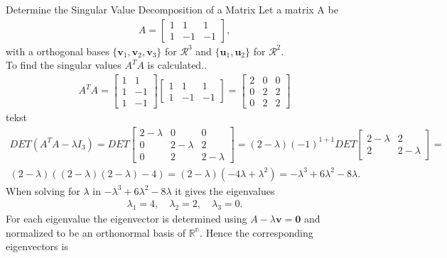 \begin{example}{Determine the Singular Value Decomposition of a Matrix}
Let a matrix A be
\begin{align*}
A=
\begin{bmatrix}
   1 & 1 & 1\\
   1 & -1 & -1
\end{bmatrix},
\end{align*}
with a orthogonal bases $\{\mathbf{v}_1,\mathbf{v}_2,\mathbf{v}_3\}$ for $\mathcal{R}^3$ and $\{\mathbf{u}_1,\mathbf{u}_2\}$ for $\mathcal{R}^2$.\\
To find the singular values $A^TA$ is calculated..
\begin{align*}
    A^TA=
    \begin{bmatrix}
       1 & 1\\
       1 & -1\\
       1 & -1
    \end{bmatrix}
    \begin{bmatrix}
       1 & 1 & 1\\
       1 & -1 & -1
    \end{bmatrix}
    =
    \begin{bmatrix}
       2 & 0 & 0\\
       0 & 2 & 2\\
       0 & 2 & 2
    \end{bmatrix}
\end{align*}
tekst
\begin{align*}
    DET(A^TA-\lambda I_3)=DET
    \begin{bmatrix}
       2-\lambda & 0 & 0\\
       0 & 2-\lambda & 2\\
       0 & 2 & 2-\lambda
    \end{bmatrix}=
    (2-\lambda)(-1)^{1+1} DET
    \begin{bmatrix}
        2-\lambda & 2 \\
        2 &2-\lambda
    \end{bmatrix}=\\
    (2-\lambda)((2-\lambda)(2-\lambda)-4) =
    (2-\lambda)(-4\lambda+\lambda^2) = -\lambda^3+6\lambda^2-8\lambda.
\end{align*}
    When solving for $\lambda$ in $-\lambda^3+6\lambda^2-8\lambda$
    it gives the eigenvalues
    \begin{align*}
      \lambda_1=4, \quad \lambda_2=2, \quad \lambda_3=0.   
    \end{align*}
    For each eigenvalue the eigenvector is determined using $A-\lambda \mathbf{v}=\mathbf{0}$ and normalized to be an orthonormal basis of $\mathbb{R^n}$. Hence the corresponding eigenvectors is

\end{example}
